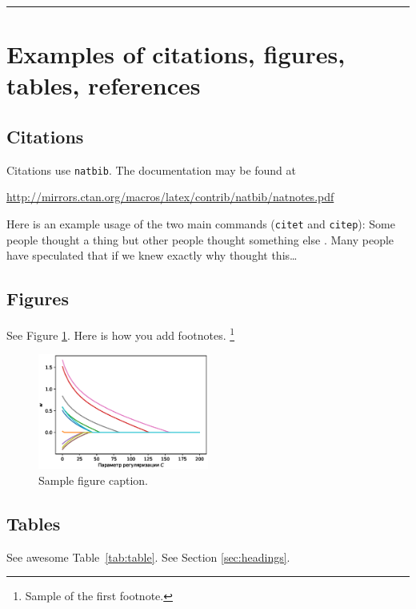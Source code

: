 \documentclass{article}
\begin{document}
\noindent\rule{16cm}{0.4pt}





\section{Examples of citations, figures, tables, references}
\label{sec:others}

\subsection{Citations}
Citations use \verb+natbib+. The documentation may be found at
\begin{center}
	\url{http://mirrors.ctan.org/macros/latex/contrib/natbib/natnotes.pdf}
\end{center}

Here is an example usage of the two main commands (\verb+citet+ and \verb+citep+): Some people thought a thing \citep{kour2014real, hadash2018estimate} but other people thought something else \citep{kour2014fast}. Many people have speculated that if we knew exactly why \citet{kour2014fast} thought this\dots

\subsection{Figures}
\lipsum[10]
See Figure \ref{fig:fig1}. Here is how you add footnotes. \footnote{Sample of the first footnote.}
\lipsum[11]

\begin{figure}
	\centering
	\includegraphics[width=0.5\textwidth]{../figures/log_reg_cs_exp.eps}
	\caption{Sample figure caption.}
	\label{fig:fig1}
\end{figure}

\subsection{Tables}
See awesome Table~\ref{tab:table}.
See Section \ref{sec:headings}.
\end{document}
